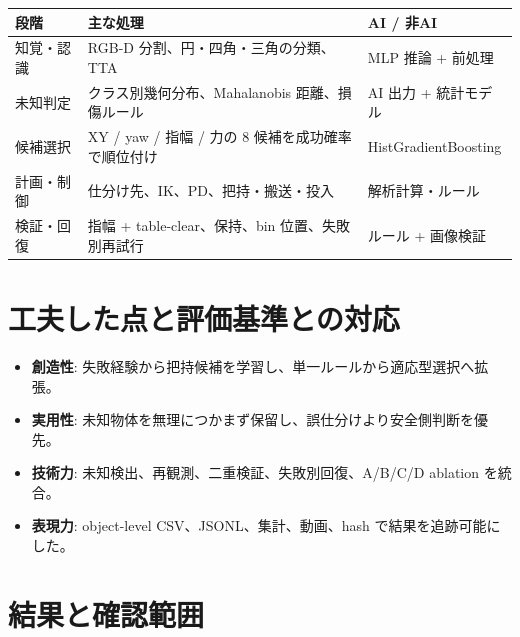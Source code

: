 \documentclass[11pt, a4paper]{article}
\begin{document}
\vspace{2mm}
\begin{table}[h!]
\centering
\small
\begin{tabularx}{\textwidth}{@{} l X X @{}}
\toprule
\textbf{段階} & \textbf{主な処理} & \textbf{AI / 非AI} \\
\midrule
知覚・認識 & RGB-D 分割、円・四角・三角の分類、TTA & MLP 推論 + 前処理 \\
未知判定 & クラス別幾何分布、Mahalanobis 距離、損傷ルール & AI 出力 + 統計モデル \\
候補選択 & XY / yaw / 指幅 / 力の 8 候補を成功確率で順位付け & HistGradientBoosting \\
計画・制御 & 仕分け先、IK、PD、把持・搬送・投入 & 解析計算・ルール \\
検証・回復 & 指幅 + table-clear、保持、bin 位置、失敗別再試行 & ルール + 画像検証 \\
\bottomrule
\end{tabularx}
\end{table}

\vspace{1mm}

\section{工夫した点と評価基準との対応}
\begin{itemize}
    \item \textbf{創造性}: 失敗経験から把持候補を学習し、単一ルールから適応型選択へ拡張。
    \item \textbf{実用性}: 未知物体を無理につかまず保留し、誤仕分けより安全側判断を優先。
    \item \textbf{技術力}: 未知検出、再観測、二重検証、失敗別回復、A/B/C/D ablation を統合。
    \item \textbf{表現力}: object-level CSV、JSONL、集計、動画、hash で結果を追跡可能にした。
\end{itemize}

\vspace{3mm}

\section{結果と確認範囲}
\end{document}
